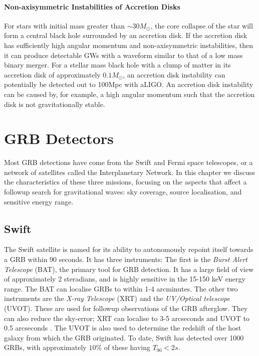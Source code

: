 \documentclass[11pt]{cuthesis}
\begin{document}
\paragraph{Non-axisymmetric Instabilities of Accretion Disks}
For stars with initial mass greater than $\sim 30M_\odot$, the core collapse of the star will form a central black hole surrounded by an accretion disk. If the accretion disk has sufficiently high angular momentum and non-axisymmetric instabilities, then it can produce detectable GWs with a waveform similar to that of a low mass binary merger. \cite{vanputten2,vanputten1} For a stellar mass black hole with a clump of matter in its accretion disk of approximately $0.1M_\odot$, an accretion disk instability can potentially be detected out to 100Mpc with aLIGO. \cite{gw_grb_paradigm,piro_pfahl} An accretion disk instability can be caused by, for example, a high angular momentum such that the accretion disk is not gravitationally stable. 

\section{GRB Detectors} \label{sec:grb detectors}
Most GRB detections have come from the Swift and Fermi space telescopes, or a network of satellites called the Interplanetary Network. In this chapter we discuss the characteristics of these three missions, focusing on the aspects that affect a followup search for gravitational waves: sky coverage, source localisation, and sensitive energy range. 

\subsection{Swift}
The Swift satellite is named for its ability to autonomously repoint itself towards a GRB within 90 seconds. It has three instruments: The first is the \textit{Burst Alert Telescope} (BAT), the primary tool for GRB detection. It has a large field of view of approximately 2 steradians, and is highly sensitive in the 15-150 keV energy range. The BAT can localise GRBs to within 1-4 arcminutes. The other two instruments are the \textit{X-ray Telescope} (XRT) and the \textit{UV/Optical telescope} (UVOT). These are used for followup observations of the GRB afterglow. They can also reduce the sky-error; XRT can localise to 3-5 arcseconds and UVOT to 0.5 arcseconds \cite{swift}. The UVOT is also used to determine the redshift of the host galaxy from which the GRB originated. To date, Swift has detected over 1000 GRBs, with approximately $10\%$ of these having $T_{90}<2s$. \cite{swift2}
\end{document}
